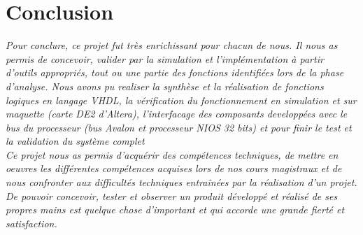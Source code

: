 \section{Conclusion}

\textit{Pour conclure, ce projet fut très enrichissant pour chacun de nous. Il nous as permis de concevoir, valider par la simulation et l’implémentation à partir d’outils appropriés, tout ou une partie des fonctions identifiées lors de la phase d'analyse. Nous avons pu realiser la synthèse et la réalisation de fonctions logiques en langage VHDL, la vérification du fonctionnement en simulation et sur maquette (carte DE2 d’Altera), l’interfacage des composants developpées avec le bus du processeur (bus Avalon et processeur NIOS 32 bits) et pour finir le test et la validation du système complet}\newline
\\

\textit{Ce projet nous as permis d'acquérir des compétences techniques, de mettre en oeuvres les différentes compétences acquises lors de nos cours magistraux et de nous confronter aux difficultés techniques entraînées par la réalisation d'un projet. De pouvoir concevoir, tester et observer un produit développé et réalisé de ses propres mains est quelque chose d'important et qui accorde une grande fierté et satisfaction.}